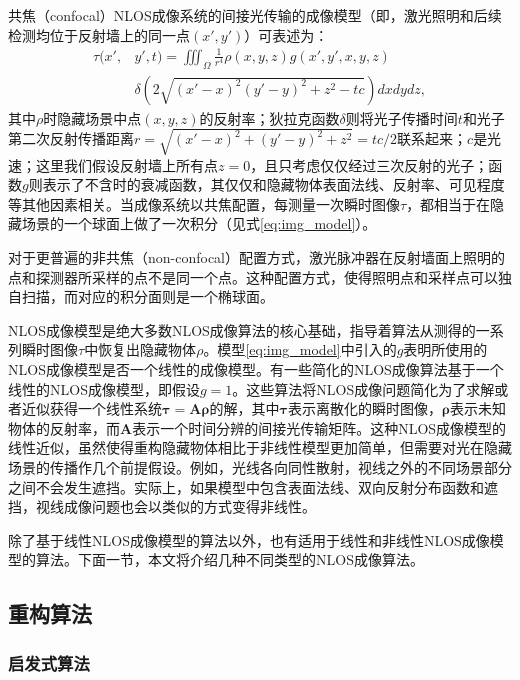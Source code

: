 \documentclass[master]{shtthesis}             %
\begin{document}
共焦（confocal）NLOS成像系统的间接光传输的成像模型（即，激光照明和后续检测均位于反射墙上的同一点$(x',y')$）可表述为：
\begin{equation}\label{eq:img_model}
  \begin{split}
    \tau(x',&y',t)=\iiint_\Omega \frac{1}{r^4}\rho(x,y,z)g(x',y',x,y,z)\\ &\delta\left(2\sqrt{(x'-x)^2(y'-y)^2+z^2-tc}\right)dxdydz,
  \end{split}
\end{equation}
其中$\rho$时隐藏场景中点$(x,y,z)$的反射率；狄拉克函数$\delta$则将光子传播时间$t$和光子第二次反射传播距离$r=\sqrt{(x'-x)^2+(y'-y)^2+z^2}=tc/2$联系起来；$c$是光速；这里我们假设反射墙上所有点$z=0$，且只考虑仅仅经过三次反射的光子；函数$g$则表示了不含时的衰减函数，其仅仅和隐藏物体表面法线、反射率、可见程度等其他因素相关。当成像系统以共焦配置，每测量一次瞬时图像$\tau$，都相当于在隐藏场景的一个球面上做了一次积分（见式\ref{eq:img_model}）。

对于更普遍的非共焦（non-confocal）配置方式，激光脉冲器在反射墙面上照明的点和探测器所采样的点不是同一个点。这种配置方式，使得照明点和采样点可以独自扫描，而对应的积分面则是一个椭球面。

NLOS成像模型是绝大多数NLOS成像算法的核心基础，指导着算法从测得的一系列瞬时图像$\tau$中恢复出隐藏物体$\rho$。模型\ref{eq:img_model}中引入的$g$表明所使用的NLOS成像模型是否一个线性的成像模型。有一些简化的NLOS成像算法基于一个线性的NLOS成像模型，即假设$g=1$。这些算法将NLOS成像问题简化为了求解或者近似获得一个线性系统$\mathbf{\tau=A\rho}$的解，其中$\mathbf{\tau}$表示离散化的瞬时图像，$\mathbf{\rho}$表示未知物体的反射率，而$\mathbf{A}$表示一个时间分辨的间接光传输矩阵。这种NLOS成像模型的线性近似，虽然使得重构隐藏物体相比于非线性模型更加简单，但需要对光在隐藏场景的传播作几个前提假设。例如，光线各向同性散射，视线之外的不同场景部分之间不会发生遮挡。实际上，如果模型中包含表面法线、双向反射分布函数和遮挡，视线成像问题也会以类似的方式变得非线性。

除了基于线性NLOS成像模型的算法以外，也有适用于线性和非线性NLOS成像模型的算法。下面一节，本文将介绍几种不同类型的NLOS成像算法。

\subsection{重构算法}

\subsubsection{启发式算法}
\end{document}
